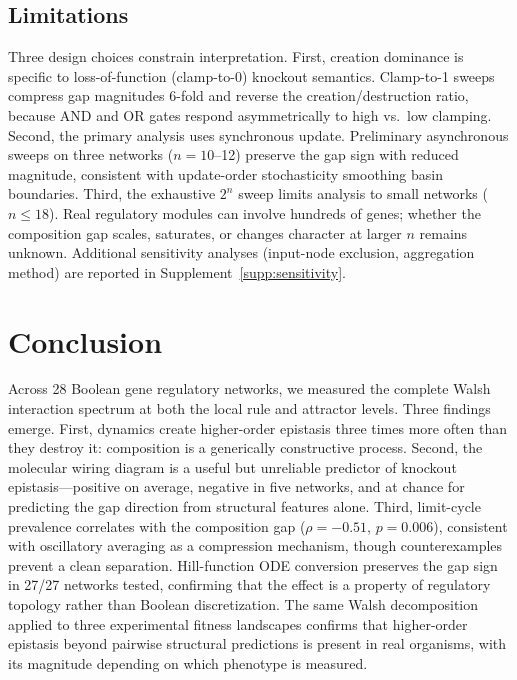 \documentclass[10pt]{article}
\begin{document}
\subsection{Limitations}

Three design choices constrain interpretation.
First, creation dominance is specific to loss-of-function (clamp-to-0)
knockout semantics. Clamp-to-1 sweeps compress gap magnitudes 6-fold
and reverse the creation/destruction ratio, because AND and OR gates
respond asymmetrically to high vs.\ low clamping.
Second, the primary analysis uses synchronous update.
Preliminary asynchronous sweeps on three networks ($n = 10$--12)
preserve the gap sign with reduced magnitude, consistent with
update-order stochasticity smoothing basin boundaries.
Third, the exhaustive $2^n$ sweep limits analysis to small
networks ($n \leq 18$). Real regulatory modules can involve
hundreds of genes; whether the composition gap scales, saturates,
or changes character at larger $n$ remains unknown.
Additional sensitivity analyses (input-node exclusion,
aggregation method) are reported in
Supplement~\ref{supp:sensitivity}.


\section{Conclusion}
\label{sec:conclusion}

Across 28 Boolean gene regulatory networks, we measured the complete
Walsh interaction spectrum at both the local rule and attractor
levels. Three findings emerge. First, dynamics create higher-order
epistasis three times more often than they destroy it: composition
is a generically constructive process. Second, the molecular wiring
diagram is a useful but unreliable predictor of knockout
epistasis---positive on average, negative in five networks, and at
chance for predicting the gap direction from structural features
alone. Third, limit-cycle prevalence correlates with the composition
gap ($\rho = -0.51$, $p = 0.006$), consistent with oscillatory
averaging as a compression mechanism, though counterexamples prevent
a clean separation. Hill-function ODE conversion preserves the gap
sign in 27/27 networks tested, confirming that the effect is a
property of regulatory topology rather than Boolean discretization.
The same Walsh decomposition applied to three experimental fitness
landscapes confirms that higher-order epistasis beyond pairwise
structural predictions is present in real organisms, with its
magnitude depending on which phenotype is measured.
\end{document}

